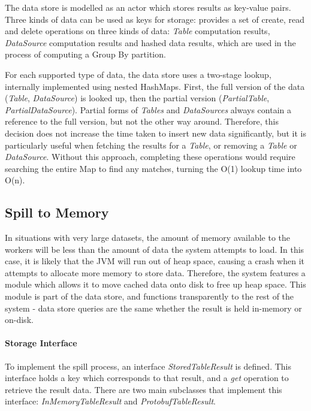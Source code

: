 The data store is modelled as an actor which stores results as key-value pairs. Three kinds of data can be used as keys for storage:
provides a set of create, read and delete operations on three kinds of data: \textit{Table} computation results, \textit{DataSource} computation  results and hashed data results, which are used in the process of computing a Group By partition. 

For each supported type of data, the data store uses a two-stage lookup, internally implemented using nested HashMaps. First, the full version of the data (\textit{Table}, \textit{DataSource}) is looked up, then the partial version (\textit{PartialTable}, \textit{PartialDataSource}). Partial forms of \textit{Tables} and \textit{DataSources} always contain a reference to the full version, but not the other way around. Therefore, this decision does not increase the time taken to insert new data significantly, but it is particularly useful when fetching the results for a \textit{Table}, or removing a \textit{Table} or \textit{DataSource}. Without this approach, completing these operations would require searching the entire Map to find any matches, turning the O(1) lookup time into O(n).

\subsection{Spill to Memory}
In situations with very large datasets, the amount of memory available to the workers will be less than the amount of data the system attempts to load. In this case, it is likely that the JVM will run out of heap space, causing a crash when it attempts to allocate more memory to store data. Therefore, the system features a module which allows it to move cached data onto disk to free up heap space. This module is part of the data store, and functions transparently to the rest of the system - data store queries are the same whether the result is held in-memory or on-disk.

\paragraph{Storage Interface}
To implement the spill process, an interface \textit{StoredTableResult} is defined. This interface holds a key which corresponds to that result, and a \textit{get} operation to retrieve the result data. There are two main subclasses that implement this interface: \textit{InMemoryTableResult} and \textit{ProtobufTableResult}. 

